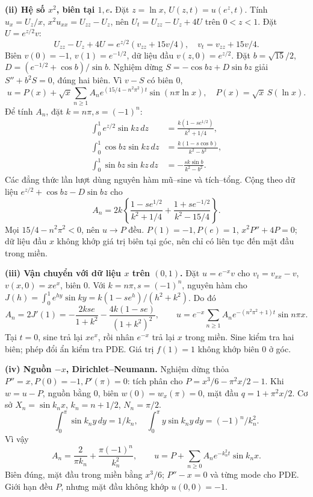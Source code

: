 \textbf{(ii) Hệ số $x^2$, biên tại $1,e$.}
Đặt $z=\ln x$, $U(z,t)=u(e^z,t)$. Tính $u_x=U_z/x$, $x^2u_{xx}=U_{zz}-U_z$, nên $U_t=U_{zz}-U_z+4U$ trên $0<z<1$. Đặt $U=e^{z/2}v$:
\[U_{zz}-U_z+4U=e^{z/2}(v_{zz}+15v/4),\quad v_t=v_{zz}+15v/4.\]
Biên $v(0)=-1$, $v(1)=e^{-1/2}$, dữ liệu đầu $v(z,0)=e^{z/2}$. Đặt $b=\sqrt{15}/2$, $D=(e^{-1/2}+\cos b)/\sin b$. Nghiệm dừng $S=-\cos bz+D\sin bz$ giải $S''+b^2S=0$, đúng hai biên. Vì $v-S$ có biên $0$,
\[u=P(x)+\sqrt x\sum_{n\ge1}A_ne^{(15/4-n^2\pi^2)t}\sin(n\pi\ln x),\quad
P(x)=\sqrt x\,S(\ln x).\]
Để tính $A_n$, đặt $k=n\pi,s=(-1)^n$:
\begin{align*}
\int_0^1e^{z/2}\sin kz\,dz&=\frac{k(1-se^{1/2})}{k^2+1/4},\\
\int_0^1\cos bz\sin kz\,dz&=\frac{k(1-s\cos b)}{k^2-b^2},\\
\int_0^1\sin bz\sin kz\,dz&=-\frac{sk\sin b}{k^2-b^2}.
\end{align*}
Các đẳng thức lần lượt dùng nguyên hàm mũ–sine và tích–tổng. Cộng theo dữ liệu $e^{z/2}+\cos bz-D\sin bz$ cho
\[A_n=2k\left\{\frac{1-se^{1/2}}{k^2+1/4}
+\frac{1+se^{-1/2}}{k^2-15/4}\right\}.\]
Mọi $15/4-n^2\pi^2<0$, nên $u\to P$ đều. $P(1)=-1,P(e)=1$, $x^2P''+4P=0$; dữ liệu đầu $x$ không khớp giá trị biên tại góc, nên chỉ có liên tục đến mặt đầu trong miền.

\textbf{(iii) Vận chuyển với dữ liệu $x$ trên $(0,1)$.}
Đặt $u=e^{-x}v$ cho $v_t=v_{xx}-v$, $v(x,0)=xe^x$, biên $0$. Với $k=n\pi,s=(-1)^n$, nguyên hàm cho $J(h)=\int_0^1e^{hy}\sin ky=k(1-se^h)/(h^2+k^2)$. Do đó
\[A_n=2J'(1)=-\frac{2kse}{1+k^2}-\frac{4k(1-se)}{(1+k^2)^2},\qquad
u=e^{-x}\sum_{n\ge1}A_ne^{-(n^2\pi^2+1)t}\sin n\pi x.\]
Tại $t=0$, sine trả lại $xe^x$, rồi nhân $e^{-x}$ trả lại $x$ trong miền. Sine kiểm tra hai biên; phép đổi ẩn kiểm tra PDE. Giá trị $f(1)=1$ không khớp biên $0$ ở góc.

\textbf{(iv) Nguồn $-x$, Dirichlet–Neumann.}
Nghiệm dừng thỏa $P''=x,P(0)=-1,P'(\pi)=0$: tích phân cho $P=x^3/6-\pi^2x/2-1$. Khi $w=u-P$, nguồn bằng $0$, biên $w(0)=w_x(\pi)=0$, mặt đầu $q=1+\pi^2x/2$. Cơ sở $X_n=\sin k_nx$, $k_n=n+1/2$, $N_n=\pi/2$.
\[\int_0^\pi\sin k_ny\,dy=1/k_n,\quad
\int_0^\pi y\sin k_ny\,dy=(-1)^n/k_n^2.\]
Vì vậy
\[A_n=\frac2{\pi k_n}+\frac{\pi(-1)^n}{k_n^2},\qquad
u=P+\sum_{n\ge0}A_ne^{-k_n^2t}\sin k_nx.\]
Biên đúng, mặt đầu trong miền bằng $x^3/6$; $P''-x=0$ và từng mode cho PDE. Giới hạn đều $P$, nhưng mặt đầu không khớp $u(0,0)=-1$.

